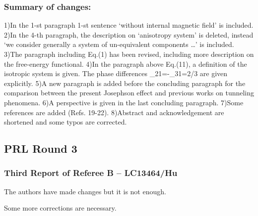 \documentclass[11pt]{article}
\begin{document}
\hypertarget{summary-of-changes-1}{%
\subsubsection{Summary of changes:}\label{summary-of-changes-1}}

1)In the 1-st paragraph 1-st sentence `without internal magnetic field'
is included. 2)In the 4-th paragraph, the description on `anisotropy
system' is deleted, instead `we consider generally a system of
un-equivalent components \ldots{}' is included. 3)The paragraph
including Eq.(1) has been revised, including more description on the
free-energy functional. 4)In the paragraph above Eq.(11), a definition
of the isotropic system is given. The phase differences
\phi\_21=-\phi\_31=2\pi/3 are given explicitly. 5)A new paragraph is
added before the concluding paragraph for the comparison between the
present Josephson effect and previous works on tunneling phenomena. 6)A
perspective is given in the last concluding paragraph. 7)Some references
are added (Refs. 19-22). 8)Abstract and acknowledgement are shortened
and some typos are corrected.

\hypertarget{prl-round-3}{%
\subsection{PRL Round 3}\label{prl-round-3}}

\hypertarget{third-report-of-referee-b-lc13464hu}{%
\subsubsection{Third Report of Referee B --
LC13464/Hu}\label{third-report-of-referee-b-lc13464hu}}

The authors have made changes but it is not enough.

Some more corrections are necessary.
\end{document}
